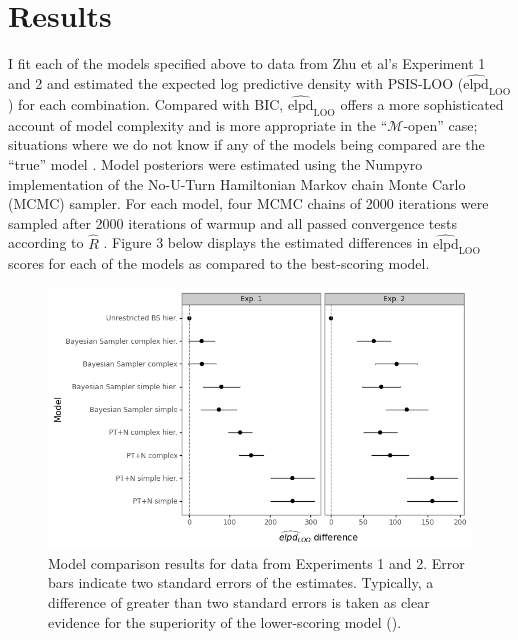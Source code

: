\documentclass[
  english,
  man,floatsintext]{apa6}
\begin{document}
\hypertarget{results}{%
\section{Results}\label{results}}

I fit each of the models specified above to data from Zhu et al's \autocite*{zhu.etal2020} Experiment 1 and 2 and estimated the expected log predictive density with PSIS-LOO (\(\widehat{\text{elpd}}_{\text{LOO}}\)) for each combination. Compared with BIC, \(\widehat{\text{elpd}}_{\text{LOO}}\) offers a more sophisticated account of model complexity and is more appropriate in the ``\(\mathcal{M}\)-open'' case; situations where we do not know if any of the models being compared are the ``true'' model \autocite{vehtari.etal2019}. Model posteriors were estimated using the Numpyro \autocite{phan.etal2019} implementation of the No-U-Turn Hamiltonian Markov chain Monte Carlo (MCMC) sampler. For each model, four MCMC chains of 2000 iterations were sampled after 2000 iterations of warmup and all passed convergence tests according to \(\hat{R}\) \autocite[see][]{gelman.etal2014a}. Figure 3 below displays the estimated differences in \(\widehat{\text{elpd}}_{\text{LOO}}\) scores for each of the models as compared to the best-scoring model.

\begin{figure}[ht]
\centering
\includegraphics[width=6in]{plot_compare.png}
\caption[]{Model comparison results for data from Experiments 1 and 2. Error bars indicate two standard errors of the estimates. Typically, a difference of greater than two standard errors is taken as clear evidence for the superiority of the lower-scoring model (\cite{sivula.etal2020}).}
\end{figure}
\end{document}
